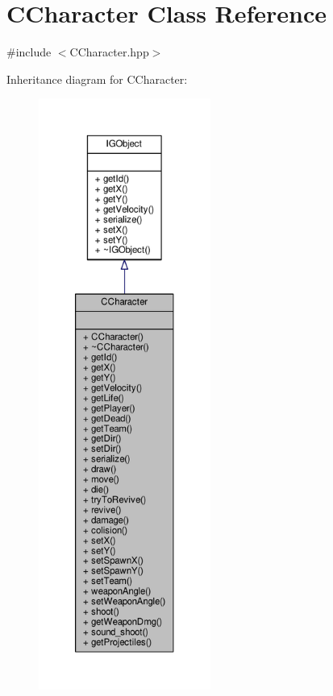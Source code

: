 \hypertarget{class_c_character}{}\section{C\+Character Class Reference}
\label{class_c_character}


{\ttfamily \#include $<$C\+Character.\+hpp$>$}



Inheritance diagram for C\+Character\+:\nopagebreak
\begin{figure}[H]
\begin{center}
\leavevmode
\includegraphics[height=550pt]{class_c_character__inherit__graph}
\end{center}
\end{figure}


